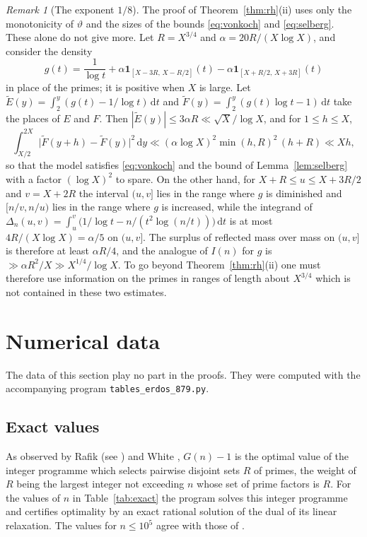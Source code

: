\documentclass[11pt,reqno]{amsart}
\theoremstyle{definition}
\theoremstyle{remark}
\newtheorem{remark}[theorem]{Remark}
\numberwithin{equation}{section}
\newcommand{\dd}{\mathrm{d}}
\begin{document}
\begin{remark}[The exponent $1/8$]\label{rem:limit}
The proof of Theorem~\ref{thm:rh}(ii) uses only the monotonicity of $\vartheta$ and the sizes of the bounds \eqref{eq:vonkoch} and \eqref{eq:selberg}. These alone do not give more. Let $R=X^{3/4}$ and $\alpha=20R/(X\log X)$, and consider the density
\[
 g(t)=\frac1{\log t}+\alpha\mathbf 1_{[X-3R,\,X-R/2]}(t)-\alpha\mathbf 1_{[X+R/2,\,X+3R]}(t)
\]
in place of the primes; it is positive when $X$ is large. Let $\widetilde E(y)=\int_2^y(g(t)-1/\log t)\,\dd t$ and $\widetilde F(y)=\int_2^y(g(t)\log t-1)\,\dd t$ take the places of $E$ and $F$. Then $|\widetilde E(y)|\le3\alpha R\ll\sqrt X/\log X$, and for $1\le h\le X$,
\[
 \int_{X/2}^{2X}\bigl|\widetilde F(y+h)-\widetilde F(y)\bigr|^2\,\dd y\ll(\alpha\log X)^2\min(h,R)^2\,(h+R)\ll Xh,
\]
so that the model satisfies \eqref{eq:vonkoch} and the bound of Lemma~\ref{lem:selberg} with a factor $(\log X)^2$ to spare. On the other hand, for $X+R\le u\le X+3R/2$ and $v=X+2R$ the interval $(u,v]$ lies in the range where $g$ is diminished and $[n/v,n/u)$ lies in the range where $g$ is increased, while the integrand of $\Delta_n(u,v)=\int_u^v\bigl(1/\log t-n/(t^2\log(n/t))\bigr)\,\dd t$ is at most $4R/(X\log X)=\alpha/5$ on $(u,v]$. The surplus of reflected mass over mass on $(u,v]$ is therefore at least $\alpha R/4$, and the analogue of $I(n)$ for $g$ is $\gg\alpha R^2/X\gg X^{1/4}/\log X$. To go beyond Theorem~\ref{thm:rh}(ii) one must therefore use information on the primes in ranges of length about $X^{3/4}$ which is not contained in these two estimates.
\end{remark}

\section{Numerical data}\label{sec:numerics}

The data of this section play no part in the proofs. They were computed with the accompanying program \texttt{tables\_erdos\_879.py}.

\subsection{Exact values}
As observed by Rafik (see \cite{Bl}) and White \cite{Wh}, $G(n)-1$ is the optimal value of the integer programme which selects pairwise disjoint sets $R$ of primes, the weight of $R$ being the largest integer not exceeding $n$ whose set of prime factors is $R$. For the values of $n$ in Table~\ref{tab:exact} the program solves this integer programme and certifies optimality by an exact rational solution of the dual of its linear relaxation. The values for $n\le10^5$ agree with those of \cite{Wh}.
\end{document}
